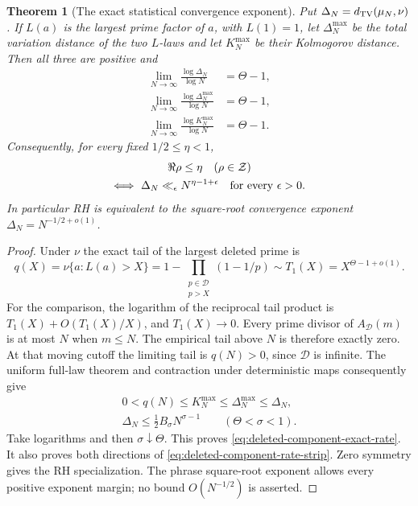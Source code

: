 \documentclass[11pt]{article}
\newtheorem{theorem}{Theorem}[section]
\theoremstyle{definition}
\begin{document}
\begin{theorem}[The exact statistical convergence exponent]
\label{thm:deleted-component-exact-rate}
Put $\Delta_N=d_{\rm TV}(\mu_N,\nu)$.
If $L(a)$ is the largest prime factor of $a$, with $L(1)=1$, let
$\Delta_N^{\max}$ be the total variation distance of the two
$L$-laws and let $K_N^{\max}$ be their Kolmogorov distance.
Then all three are positive and
\begin{equation}
 \begin{aligned}
 \lim_{N\to\infty}\frac{\log\Delta_N}{\log N}&=\Theta-1,\\
 \lim_{N\to\infty}\frac{\log\Delta_N^{\max}}{\log N}&=\Theta-1,\\
 \lim_{N\to\infty}\frac{\log K_N^{\max}}{\log N}&=\Theta-1.
 \end{aligned}
 \label{eq:deleted-component-exact-rate}
\end{equation}
Consequently, for every fixed $1/2\le\eta<1$,
\begin{equation}
 \begin{gathered}
 \Re\rho\le\eta\quad(\rho\in\mathcal Z)\\
 \Longleftrightarrow\
 \Delta_N\ll_\epsilon N^{\eta-1+\epsilon}
                         \quad\hbox{for every }\epsilon>0.
 \end{gathered}
 \label{eq:deleted-component-rate-strip}
\end{equation}
In particular RH is equivalent to the square-root convergence
exponent $\Delta_N=N^{-1/2+o(1)}$.
\end{theorem}

\begin{proof}
Under $\nu$ the exact tail of the largest deleted prime is
\[
 q(X)=\nu\{a:L(a)>X\}
       =1-\prod_{\substack{p\in\mathcal D\\p>X}}(1-1/p)
       \sim T_1(X)=X^{\Theta-1+o(1)}.
\]
For the comparison, the logarithm of the reciprocal tail product is
$T_1(X)+O(T_1(X)/X)$, and $T_1(X)\to0$.
Every prime divisor of $A_{\mathcal D}(m)$ is at most $N$ when
$m\le N$. The empirical tail above $N$ is therefore exactly zero.
At that moving cutoff the limiting tail is $q(N)>0$, since
$\mathcal D$ is infinite.
The uniform full-law theorem and contraction under deterministic
maps consequently give
\[
 \begin{gathered}
 0<q(N)\le K_N^{\max}\le\Delta_N^{\max}\le\Delta_N,\\
 \Delta_N\le\tfrac12 B_\sigma N^{\sigma-1}
                         \qquad(\Theta<\sigma<1).
 \end{gathered}
\]
Take logarithms and then $\sigma\downarrow\Theta$.
This proves \eqref{eq:deleted-component-exact-rate}.
It also proves both directions of
\eqref{eq:deleted-component-rate-strip}.
Zero symmetry gives the RH specialization.
The phrase square-root exponent allows every positive exponent margin;
no bound $O(N^{-1/2})$ is asserted.
\end{proof}
\end{document}
